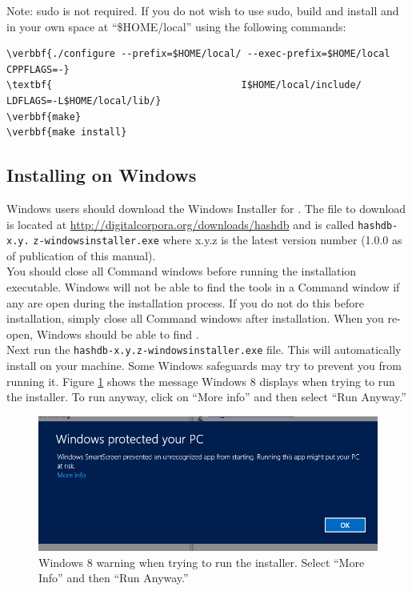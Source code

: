 \documentclass[11pt,fleqn]{article} %
\begin{document}
Note: sudo is not required. If you do not wish to use sudo,  build and install \hash and \bulk in your own space at ``\$HOME/local'' using the following commands:
\begin{Verbatim}[commandchars=\\\{\}]
\verbbf{./configure --prefix=$HOME/local/ --exec-prefix=$HOME/local CPPFLAGS=-}
\textbf{                                 I$HOME/local/include/ LDFLAGS=-L$HOME/local/lib/}
\verbbf{make}
\verbbf{make install}
\end{Verbatim}

\subsection{Installing on Windows}
\label{InstallingOnWindows}
Windows users should download the Windows Installer for \hash. The file to download is located at \url{http://digitalcorpora.org/downloads/hashdb} and is called \texttt{hashdb-x.y.} \texttt{z-windowsinstaller.exe} where x.y.z is the latest version number (1.0.0 as of publication of this manual).\\

You should close all Command windows before running the installation executable. Windows will not be able to find the \hash tools in a Command window if any are open during the installation process. If you do not do this before installation, simply close all Command windows after installation. When you re-open, Windows should be able to find \hash.\\


 Next run the \texttt{hashdb-x.y.z-windowsinstaller.exe} file. This will automatically install \hash on your machine. Some Windows safeguards may try to prevent you from running it. Figure \ref{fig:windowsWarning} shows the message Windows 8 displays when trying to run the installer. To run anyway, click on ``More info'' and then select ``Run Anyway.'' \\
\begin{figure}
	\center
	\includegraphics[scale=.5]{windowsWarning.png}
	\caption{Windows 8 warning when trying to run the installer. Select ``More Info'' and then ``Run Anyway.''}
	\label{fig:windowsWarning}
\end{figure}
\end{document}
